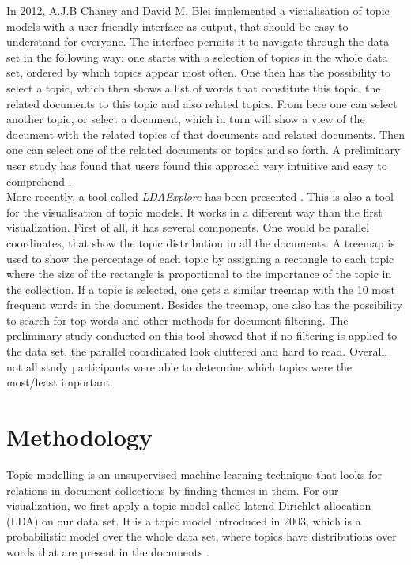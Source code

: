 \documentclass[11pt]{article}
\begin{document}
In 2012, A.J.B Chaney and David M. Blei \cite{Chaney2012VisualizingTM} implemented a visualisation of topic models with a user-friendly interface as output, that should be easy to understand for everyone. The interface permits it to navigate through the data set in the following way: one starts with a selection of topics in the whole data set, ordered by which topics appear most often. One then has the possibility to select a topic, which then shows a list of words that constitute this topic, the related documents to this topic and also related topics. From here one can select another topic, or select a document, which in turn will show a view of the document with the related topics of that documents and related documents. Then one can select one of the related documents or topics and so forth. A preliminary user study has found that users found this approach very intuitive and easy to comprehend \cite{Chaney2012VisualizingTM}.\\
More recently, a tool called \textit{LDAExplore} has been presented \cite{Ganesan2015LDAExploreVT}. This is also a tool for the visualisation of topic models. It works in a different way than the first visualization. First of all, it has several components. One would be parallel coordinates, that show the topic distribution in all the documents. A treemap is used to show the percentage of each topic by assigning a rectangle to each topic where the size of the rectangle is proportional to the importance of the topic in the collection. If a topic is selected, one gets a similar treemap with the 10 most frequent words in the document. Besides the treemap, one also has the possibility to search for top words and other methods for document filtering. The preliminary study conducted on this tool \cite{Ganesan2015LDAExploreVT} showed that if no filtering is applied to the data set, the parallel coordinated look cluttered and hard to read. Overall, not all study participants were able to determine which topics were the most/least important.

\section{Methodology}
%

Topic modelling is an unsupervised machine learning technique that looks for relations in document collections by finding themes in them. For our visualization, we first apply a topic model called latend Dirichlet allocation (LDA) on our data set. It is a topic model introduced in 2003, which is a probabilistic model over the whole data set, where topics have distributions over words that are present in the documents \cite{Blei03latentdirichlet}.
\end{document}
